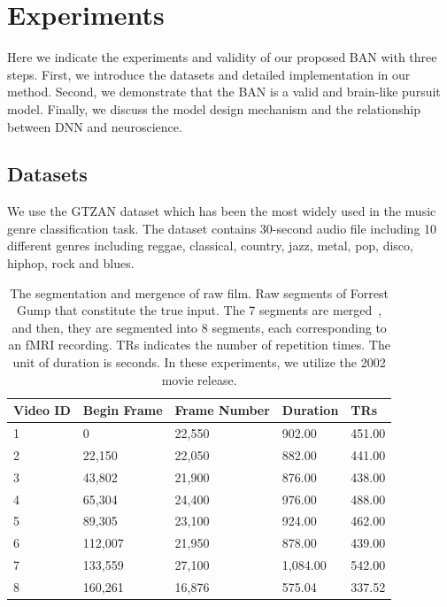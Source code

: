 \documentclass[journal]{IEEEtran}
\begin{document}
\section{Experiments} \label{sec:experiments}
Here we indicate the experiments and validity of our proposed BAN with three steps. 
First, we introduce the datasets and detailed implementation in our method.
Second, we demonstrate that the BAN is a valid and brain-like pursuit model.
Finally, we discuss the model design mechanism and the relationship between DNN and neuroscience. 


\subsection{Datasets} \label{sec:datasets}
We use the GTZAN dataset which has been the most widely used in the music genre classification task.
The dataset contains 30-second audio file including 10 different genres including reggae, classical, country, jazz, metal, pop, disco, hiphop, rock and blues.


\begin{table}[h]
	\centering
	\footnotesize
	\caption{The segmentation and mergence of raw film.
		Raw segments of Forrest Gump that constitute the true input. 
		The 7 segments are merged~\cite{2014A}, and then, they are segmented into 8 segments, each corresponding to an fMRI recording. 
		TRs indicates the number of repetition times.
		The unit of duration is seconds.
		In these experiments, we utilize the 2002 movie release.}
	
	\label{tab:movie_seg}
	
	\begin{tabular}{p{0.9cm}<{\centering}p{1.2cm}<{\centering}p{1.45cm}<{\centering}p{1.15cm}<{\centering}p{0.95cm}<{\centering}}
		\toprule[1.5pt]
		{Video ID} & {Begin Frame} & {Frame Number} & {Duration}  & {TRs}   \\ \midrule[1pt]
		1       & 0           & 22,550      & 902.00 & 451.00 \\ 
		2       & 22,150      & 22,050      & 882.00 & 441.00 \\ 
		3       & 43,802      & 21,900      & 876.00 & 438.00 \\ 
		4       & 65,304      & 24,400     & 976.00 & 488.00 \\ 
		5       & 89,305     & 23,100     & 924.00 & 462.00 \\ 
		6       & 112,007     & 21,950     & 878.00 & 439.00 \\ 
		7       & 133,559     & 27,100     & 1,084.00 & 542.00 \\
		8       & 160,261     & 16,876     & 575.04 & 337.52 \\ 
		\bottomrule[1.5pt]
	\end{tabular}
	
\end{table}
\end{document}
